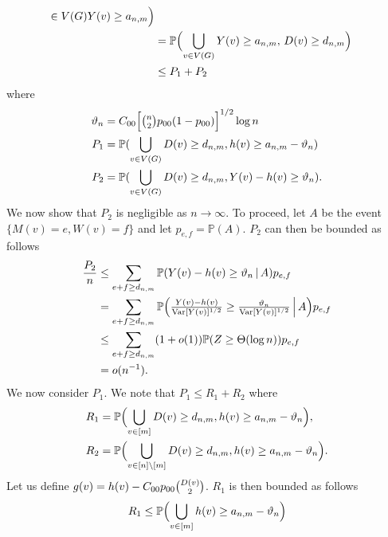 \documentclass[10pt,journal,compsoc]{IEEEtran}
\theoremstyle{definition}
\begin{document}
\begin{IEEEproof}
\begin{IEEEproof}[Eq.~\eqref{eq:27}]
\begin{equation*}
\begin{split}
{      \in V(G)} Y(v) \geq a_{n,m}\Bigr) \\
    &= \mathbb{P}\Bigl( \bigcup_{v
      \in V(G)} Y(v) \geq a_{n,m}, \, D(v) \geq d_{n,m} \Bigr) \\
    &\leq P_1 + P_2
    \end{split}
  \end{equation*}
  where 
  \begin{align*}
    \vartheta_n &= C_{00} \Bigl[ \tbinom{n}{2} p_{00} (1 -
    p_{00})\Bigr]^{1/2} \log{n} \\
    P_1 &= \mathbb{P}(\bigcup_{v \in V(G)} D(v) \geq d_{n,m}, h(v) \geq
    a_{n,m} - \vartheta_n) \\
    P_2 &= \mathbb{P}(\bigcup_{v \in V(G)} D(v) \geq d_{n,m},
    Y(v) - h(v) \geq \vartheta_n).
  \end{align*}
  We now show that $P_2$ is negligible as $n \rightarrow \infty$. To
  proceed, let $A$ be the event $\{M(v) = e, W(v) = f\}$ and let
  $p_{e,f} = \mathbb{P}(A)$. $P_2$ can then be bounded as follows
\begin{equation*}
  \begin{split}
    \frac{P_2}{n} & \leq \sum_{e + f \geq
        d_{n,m}}{\mathbb{P}( Y(v) - h(v) \geq
      \vartheta_{n} \, | \, A)} p_{e,f}  \\
  &=  \sum_{e + f \geq d_{n,m}}{\mathbb{P}\Bigl(
    \tfrac{Y(v) - h(v)}{\mathrm{Var}[Y(v)]^{1/2}} \geq
    \tfrac{\vartheta_n}{\mathrm{Var}[Y(v)]^{1/2}} \, \Bigl| \, A\Bigr) p_{e,f}} \\
    &\leq \sum_{e + f \geq d_{n,m}} (1 + o(1))
    \mathbb{P}(Z \geq \Theta(\log{n})) p_{e,f} \\ &= o(n^{-1}).
  \end{split}
\end{equation*}
We now consider $P_1$. We note that $P_1 \leq R_1 + R_2$
where
\begin{align*}
  R_1 &= \mathbb{P}\Bigl(\bigcup_{v \in [m]} D(v) \geq
  d_{n,m}, h(v) \geq a_{n,m} - \vartheta_n \Bigr), \\  
  R_2 &= \mathbb{P}\Bigl(\bigcup_{v \in [n] \setminus [m]} D(v) \geq
  d_{n,m}, h(v) \geq a_{n,m} - \vartheta_n \Bigr).
\end{align*}
Let us define $g(v) = h(v) - C_{00}p_{00} \tbinom{D(v)}{2}$.
$R_1$ is then bounded as follows
\begin{equation}
  \begin{split}
    \label{eq:36}
    R_1 &\leq \mathbb{P}\Bigl( \bigcup_{v \in [m]} h(v) \geq
    a_{n,m} - \vartheta_{n} \Bigr) \\

\end{split}
\end{equation}
\end{IEEEproof}
\end{IEEEproof}
\end{document}
